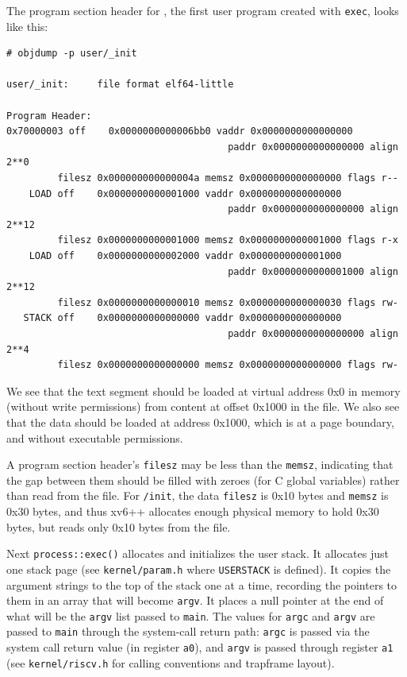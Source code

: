 The program section header for , the first user program created
with \lstinline{exec}, looks like this:
\begin{footnotesize}
\begin{verbatim}
# objdump -p user/_init

user/_init:     file format elf64-little

Program Header:
0x70000003 off    0x0000000000006bb0 vaddr 0x0000000000000000
                                       paddr 0x0000000000000000 align 2**0
         filesz 0x000000000000004a memsz 0x0000000000000000 flags r--
    LOAD off    0x0000000000001000 vaddr 0x0000000000000000
                                       paddr 0x0000000000000000 align 2**12
         filesz 0x0000000000001000 memsz 0x0000000000001000 flags r-x
    LOAD off    0x0000000000002000 vaddr 0x0000000000001000
                                       paddr 0x0000000000001000 align 2**12
         filesz 0x0000000000000010 memsz 0x0000000000000030 flags rw-
   STACK off    0x0000000000000000 vaddr 0x0000000000000000
                                       paddr 0x0000000000000000 align 2**4
         filesz 0x0000000000000000 memsz 0x0000000000000000 flags rw-
\end{verbatim}
\end{footnotesize}

We see that the text segment should be loaded at virtual address 0x0 in
memory (without write permissions) from content at offset 0x1000 in the
file. We also see that the data should be loaded at address 0x1000, which
is at a page boundary, and without executable permissions.

A program section header's \lstinline{filesz} may be less than the
\lstinline{memsz}, indicating that the gap between them should be filled
with zeroes (for C global variables) rather than read from the file. For
\lstinline{/init}, the data \lstinline{filesz} is 0x10 bytes and
\lstinline{memsz} is 0x30 bytes, and thus xv6++ allocates enough physical
memory to hold 0x30 bytes, but reads only 0x10 bytes from the file.

Next \lstinline{process::exec()} allocates and initializes the user stack.
It allocates just one stack page (see \texttt{kernel/param.h} where
\lstinline{USERSTACK} is defined). It copies the argument strings to the
top of the stack one at a time, recording the pointers to them in an array
that will become \lstinline{argv}. It places a null pointer at the end of
what will be the \lstinline{argv} list passed to \lstinline{main}. The values
for \lstinline{argc} and \lstinline{argv} are passed to \lstinline{main}
through the system-call return path: \lstinline{argc} is passed via the
system call return value (in register \texttt{a0}), and \lstinline{argv} is
passed through register \texttt{a1} (see \texttt{kernel/riscv.h} for calling
conventions and trapframe layout).

